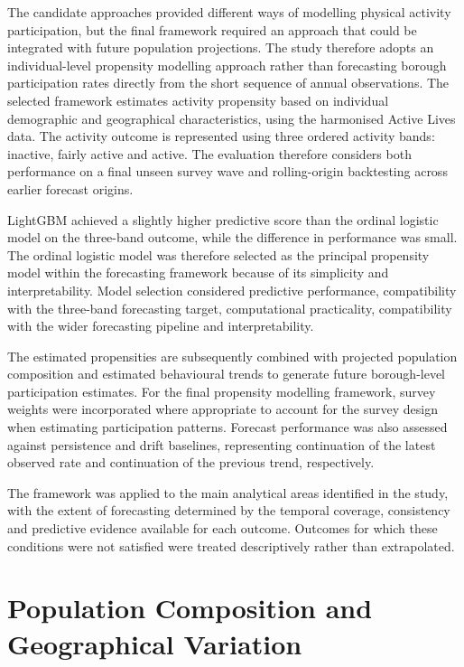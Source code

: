 \documentclass[ %
                    author={Ashrey Ashrey, Sanya Kapoor, Trisha Sharma, Yash Bhooshan Pandloskar},
                supervisor={Dr. Dalila O’Grady},
                    degree={MSc},
                     title={Using machine learning to forecast physical activity participation, volunteering and activity patterns in London},
                  subtitle={},
                      type={},
                      year={2021}]{dissertation}
\begin{document}
The candidate approaches provided different ways of modelling physical activity participation, but the final framework required an approach that could be integrated with future population projections. The study therefore adopts an individual-level propensity modelling approach rather than forecasting borough participation rates directly from the short sequence of annual observations. The selected framework estimates activity propensity based on individual demographic and geographical characteristics, using the harmonised Active Lives data. The activity outcome is represented using three ordered activity bands: inactive, fairly active and active. The evaluation therefore considers both performance on a final unseen survey wave and rolling-origin backtesting across earlier forecast origins.

LightGBM achieved a slightly higher predictive score than the ordinal logistic model on the three-band outcome, while the difference in performance was small. The ordinal logistic model was therefore selected as the principal propensity model within the forecasting framework because of its simplicity and interpretability. Model selection considered predictive performance, compatibility with the three-band forecasting target, computational practicality, compatibility with the wider forecasting pipeline and interpretability.

The estimated propensities are subsequently combined with projected population composition and estimated behavioural trends to generate future borough-level participation estimates. For the final propensity modelling framework, survey weights were incorporated where appropriate to account for the survey design when estimating participation patterns. Forecast performance was also assessed against persistence and drift baselines, representing continuation of the latest observed rate and continuation of the previous trend, respectively.

The framework was applied to the main analytical areas identified in the study, with the extent of forecasting determined by the temporal coverage, consistency and predictive evidence available for each outcome. Outcomes for which these conditions were not satisfied were treated descriptively rather than extrapolated.

\section{Population Composition and Geographical Variation}
\end{document}
